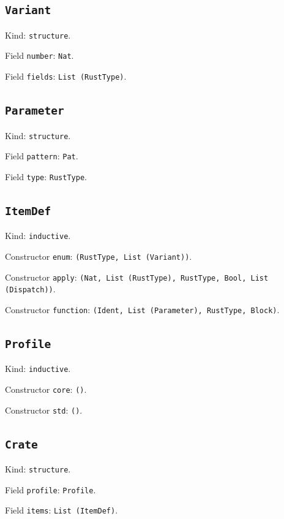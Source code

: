 \documentclass[11pt]{article}
\begin{document}
\subsection*{\texttt{Variant}}
\noindent Kind: \texttt{structure}.\par
\noindent Field \texttt{number}: \texttt{Nat}.\par
\noindent Field \texttt{fields}: \texttt{List (RustType)}.\par
\subsection*{\texttt{Parameter}}
\noindent Kind: \texttt{structure}.\par
\noindent Field \texttt{pattern}: \texttt{Pat}.\par
\noindent Field \texttt{type}: \texttt{RustType}.\par
\subsection*{\texttt{ItemDef}}
\noindent Kind: \texttt{inductive}.\par
\noindent Constructor \texttt{enum}: \texttt{(RustType, List (Variant))}.\par
\noindent Constructor \texttt{apply}: \texttt{(Nat, List (RustType), RustType, Bool, List (Dispatch))}.\par
\noindent Constructor \texttt{function}: \texttt{(Ident, List (Parameter), RustType, Block)}.\par
\subsection*{\texttt{Profile}}
\noindent Kind: \texttt{inductive}.\par
\noindent Constructor \texttt{core}: \texttt{()}.\par
\noindent Constructor \texttt{std}: \texttt{()}.\par
\subsection*{\texttt{Crate}}
\noindent Kind: \texttt{structure}.\par
\noindent Field \texttt{profile}: \texttt{Profile}.\par
\noindent Field \texttt{items}: \texttt{List (ItemDef)}.\par
\end{document}
